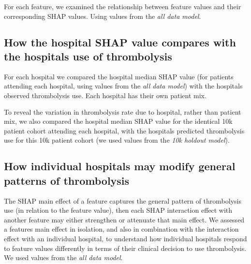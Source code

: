 For each feature, we examined the relationship between feature values and their corresponding SHAP values. Using values from the \emph{all data model}.




\subsection{How the hospital SHAP value compares with the hospitals use of thrombolysis}

For each hospital we compared the hospital median SHAP value (for patients attending each hospital, using values from the \emph{all data model}) with the hospitals observed thrombolysis use. Each hospital has their own patient mix.

To reveal the variation in thrombolysis rate due to hospital, rather than patient mix, we also compared the hospital median SHAP value for the identical 10k patient cohort attending each hospital, with the hospitals predicted thrombolysis use for this 10k patient cohort (we used values from the \emph{10k holdout model}).



\subsection{How individual hospitals may modify general patterns of thrombolysis}

The SHAP main effect of a feature captures the general pattern of thrombolysis use (in relation to the feature value), then each SHAP interaction effect with another feature may either strengthen or attenuate that main effect. We assessed a features main effect in isolation, and also in combination with the interaction effect with an individual hospital, to understand how individual hospitals respond to feature values differently in terms of their clinical decision to use thrombolysis. We used values from the \emph{all data model}.

